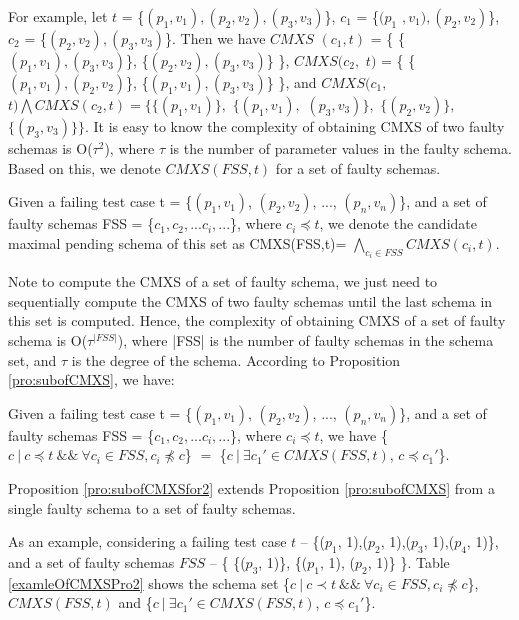 For example, let $t$ = \{$(p_{1},v_{1}), (p_{2}, v_{2}), (p_{3}, v_{3})$\}, $c_{1}$ = \{$(p_{1}$ $, v_{1}), (p_{2}, v_{2})$\}, $c_{2}$ = \{$(p_{2}, v_{2}), (p_{3}, v_{3})$\}. Then we have $CMXS$ $(c_{1}, t)$ = \{ \{$(p_{1}, v_{1}), (p_{3}, v_{3})$\}, \{$(p_{2}, v_{2}), (p_{3}, v_{3})$\} \}, $CMXS(c_{2},$ $ t)$ = \{ \{$(p_{1}, v_{1}), (p_{2}, v_{2})$\}, \{$(p_{1}, v_{1}), (p_{3}, v_{3})$\} \}, and  $CMXS(c_{1},$ $ t) \bigwedge CMXS(c_{2}, t) = \{ \{(p_{1}, v_{1})\},$ $ \{(p_{1}, v_{1}), $ $(p_{3}, v_{3})\}, $ $ \{(p_{2}, v_{2})\}, $ $\{(p_{3}, v_{3})\} \} $. It is easy to know the complexity of obtaining CMXS of two faulty schemas is O($\tau^{2}$), where $\tau$ is the number of parameter values in the faulty schema. Based on this, we denote $CMXS(FSS,t)$ for a set of faulty schemas.

\begin{definition}
Given a failing test case t = \{$(p_{1}, v_{1})$, $(p_{2}, v_{2})$, ..., $(p_{n}, v_{n})$\}, and a set of faulty schemas FSS = \{$c_{1} , c_{2}, ... c_{i}, ...$\}, where $ c_{i} \preceq t$,  we denote the candidate maximal pending schema of this set as CMXS(FSS,t)= $\bigwedge_{c_{i}\in FSS} CMXS(c_{i}, t)$.
\end{definition}

Note to compute the CMXS of a set of faulty schema, we just need to sequentially compute the CMXS of two faulty schemas until the last schema in this set is computed. Hence, the complexity of obtaining CMXS of a set of faulty schema is O($\tau^{|FSS|}$), where |FSS| is the number of faulty schemas in the schema set, and $\tau$ is the degree of the schema. According to Proposition \ref{pro:subofCMXS}, we have:

\begin{proposition}\label{pro:subofCMXSfor2}
Given a failing test case t = \{$(p_{1}, v_{1})$, $(p_{2}, v_{2})$, ..., $(p_{n}, v_{n})$\}, and a set of faulty schemas FSS = \{$c_{1} , c_{2}, ... c_{i}, ...$\}, where $ c_{i} \preceq t$,  we have \{$c\ |\ c \preceq t\ \&\&\ \forall c_{i} \in FSS, c_{i} \npreceq c $\} $=$  \{$ c\ |\ \exists c_{1}' \in CMXS(FSS, t)$, $c \preceq c_{1}'$\}.
\end{proposition}

Proposition \ref{pro:subofCMXSfor2} extends Proposition \ref{pro:subofCMXS} from a single faulty schema to a set of faulty schemas.

As an example, considering a failing test case $t$ -- \{($p_{1}$, 1),($p_{2}$, 1),($p_{3}$, 1),($p_{4}$, 1)\}, and a set of faulty schemas  $FSS$ -- \{ \{($p_{3}$, 1)\},  \{($p_{1}$, 1), ($p_{2}$, 1)\} \}. Table \ref{examleOfCMXSPro2} shows the schema set \{$c\ |\ c \prec t\ \&\&\ \forall c_{i} \in FSS, c_{i} \npreceq c $\}, $CMXS(FSS, t)$ and \{$ c\ |\ \exists c_{1}' \in CMXS(FSS, t)$, $c \preceq c_{1}'$\}.

